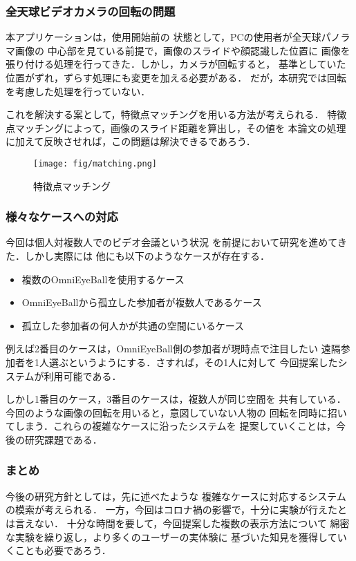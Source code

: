 \subsubsection*{全天球ビデオカメラの回転の問題}

本アプリケーションは，使用開始前の
状態として，PCの使用者が全天球パノラマ画像の
中心部を見ている前提で，画像のスライドや顔認識した位置に
画像を張り付ける処理を行ってきた．しかし，カメラが回転すると，
基準としていた位置がずれ，ずらす処理にも変更を加える必要がある．
だが，本研究では回転を考慮した処理を行っていない．

これを解決する案として，特徴点マッチングを用いる方法が考えられる．
特徴点マッチングによって，画像のスライド距離を算出し，その値を
本論文の処理に加えて反映させれば，この問題は解決できるであろう．

\begin{figure}[tp]
  \centering
  \texttt{[image: fig/matching.png]}
  \caption{特徴点マッチング} \cite{17}
\end{figure}

\subsubsection*{様々なケースへの対応}
今回は個人対複数人でのビデオ会議という状況
を前提において研究を進めてきた．しかし実際には
他にも以下のようなケースが存在する．
\begin{itemize}
  \item 複数のOmniEyeBallを使用するケース
  \item OmniEyeBallから孤立した参加者が複数人であるケース
  \item 孤立した参加者の何人かが共通の空間にいるケース
\end{itemize}

例えば2番目のケースは，OmniEyeBall側の参加者が現時点で注目したい
遠隔参加者を1人選ぶというようにする．さすれば，その1人に対して
今回提案したシステムが利用可能である．

しかし1番目のケース，3番目のケースは，複数人が同じ空間を
共有している．今回のような画像の回転を用いると，意図していない人物の
回転を同時に招いてしまう．これらの複雑なケースに沿ったシステムを
提案していくことは，今後の研究課題である．

\subsubsection*{まとめ}
今後の研究方針としては，先に述べたような
複雑なケースに対応するシステムの模索が考えられる．
一方，今回はコロナ禍の影響で，十分に実験が行えたとは言えない．
十分な時間を要して，今回提案した複数の表示方法について
綿密な実験を繰り返し，より多くのユーザーの実体験に
基づいた知見を獲得していくことも必要であろう．